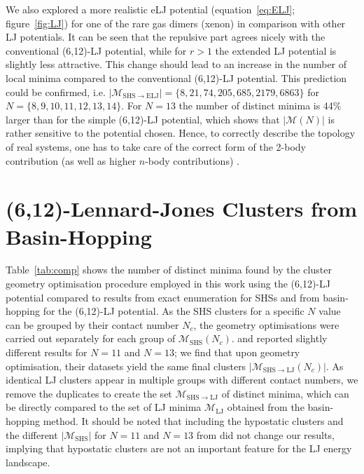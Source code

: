 We also explored a more realistic \ac{eLJ} potential (equation~\eqref{eq:ELJ};
figure~\ref{fig:LJ}) for one of the rare gas dimers (xenon) in comparison with
other \ac{LJ} potentials. It can be seen that the repulsive part agrees nicely
with the conventional (6,12)-\ac{LJ} potential, while for $r > 1$ the extended
\ac{LJ} potential is slightly less attractive. This change should lead to an
increase in the number of local minima compared to the conventional
(6,12)-\ac{LJ} potential. This prediction could be confirmed, i.e.
$|\mathcal{M}_\mathrm{SHS\to ELJ}|=\{8,21,74,205,685,2179,6863\}$ for
$N=\{8,9,10,11,12,13,14\}$. For $N=13$ the number of distinct minima is 44\%
larger than for the simple (6,12)-\ac{LJ} potential, which shows that
$|\mathcal{M}(N)|$ is rather sensitive to the potential chosen. Hence, to
correctly describe the topology of real systems, one has to take care of the
correct form of the 2-body contribution (as well as higher $n$-body
contributions) \autocite{Schwerdtfeger-2016}.


\section{(6,12)-Lennard-Jones Clusters from Basin-Hopping} 
\label{sec:612LennardJonesClustersfromBasinHopping}

Table~\ref{tab:comp} shows the number of distinct minima found by the cluster
geometry optimisation procedure employed in this work using the (6,12)-\ac{LJ}
potential compared to results from exact enumeration for \ac{SHS}s and from
basin-hopping for the (6,12)-\ac{LJ} potential. As the \ac{SHS} clusters for a
specific $N$ value can be grouped by their contact number $N_c$, the geometry
optimisations were carried out separately for each group of
$\mathcal{M}_\mathrm{SHS}(N_c)$.
\citeauthor{Hoy_Structurefinitesphere_2012}
\autocite{Hoy_Structurefinitesphere_2012,Hoy_Structuredynamicsmodel_2015} and
\citeauthor{Holmes-Cerfon_EnumeratingRigidSphere_2016}\autocite{Holmes-Cerfon_EnumeratingRigidSphere_2016}
reported slightly different results for $N=11$ and $N=13$; we find that upon
geometry optimisation, their datasets yield the same final clusters
$|\mathcal{M}_{\mathrm{SHS\to LJ}}(N_c)|$. As identical \ac{LJ} clusters appear
in multiple groups with different contact numbers, we remove the duplicates to
create the set $\mathcal{M}_\mathrm{SHS\to LJ}$ of distinct minima, which can be
directly compared to the set of \ac{LJ} minima $\mathcal{M}_\mathrm{LJ}$
obtained from the basin-hopping method. It should be noted that including the
hypostatic clusters and the different $|\mathcal{M}_\mathrm{SHS}|$ for $N=11$
and $N=13$ from
\citeauthor{Holmes-Cerfon_EnumeratingRigidSphere_2016}\autocite{Holmes-Cerfon_EnumeratingRigidSphere_2016}
did not change our results, implying that hypostatic clusters are not an
important feature for the \ac{LJ} energy landscape. 


